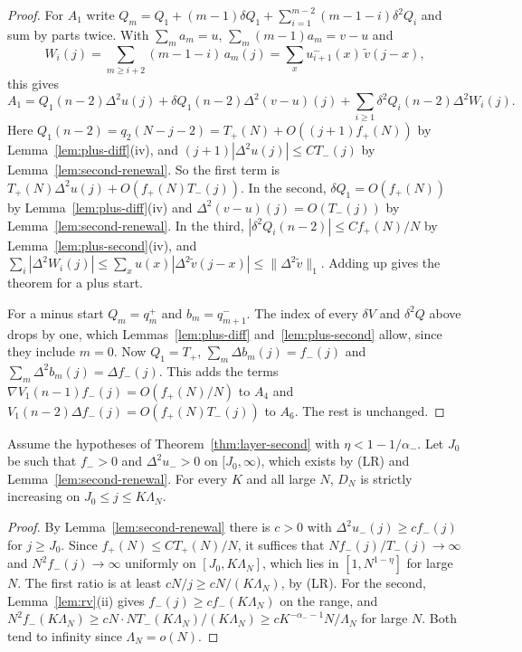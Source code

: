 \begin{proof}
For $A_1$ write
$Q_m=Q_1+(m-1)\delta Q_1+\sum_{i=1}^{m-2}(m-1-i)\delta^2Q_i$ and sum by parts twice. With
$\sum_ma_m=u$, $\sum_m(m-1)a_m=v-u$ and
\[
 W_i(j)=\sum_{m\ge i+2}(m-1-i)\,a_m(j)=\sum_xu^\minus_{i+1}(x)\,\tilde v(j-x),
\]
this gives
\[
 A_1=Q_1(n-2)\Delta^2u(j)+\delta Q_1(n-2)\Delta^2(v-u)(j)+\sum_{i\ge1}\delta^2Q_i(n-2)\Delta^2W_i(j).
\]
Here $Q_1(n-2)=q_2(N-j-2)=T_\plus(N)+O((j+1)f_\plus(N))$ by Lemma~\ref{lem:plus-diff}(iv), and
$(j+1)|\Delta^2u(j)|\le CT_\minus(j)$ by Lemma~\ref{lem:second-renewal}. So the first term is
$T_\plus(N)\Delta^2u(j)+O(f_\plus(N)T_\minus(j))$. In the second, $\delta Q_1=O(f_\plus(N))$ by
Lemma~\ref{lem:plus-diff}(iv) and $\Delta^2(v-u)(j)=O(T_\minus(j))$ by
Lemma~\ref{lem:second-renewal}. In the third, $|\delta^2Q_i(n-2)|\le Cf_\plus(N)/N$ by
Lemma~\ref{lem:plus-second}(iv), and
$\sum_i|\Delta^2W_i(j)|\le\sum_xu(x)|\Delta^2\tilde v(j-x)|\le\|\Delta^2\tilde v\|_1$. Adding up
gives the theorem for a plus start.

For a minus start $Q_m=q^\plus_m$ and $b_m=q^\minus_{m+1}$. The index of every $\delta V$ and
$\delta^2Q$ above drops by one, which Lemmas~\ref{lem:plus-diff} and~\ref{lem:plus-second} allow,
since they include $m=0$. Now $Q_1=T_\plus$, $\sum_m\Delta b_m(j)=f_\minus(j)$ and
$\sum_m\Delta^2b_m(j)=\Delta f_\minus(j)$. This adds the terms $\nabla V_1(n-1)f_\minus(j)=O(f_\plus(N)/N)$
to $A_4$ and $V_1(n-2)\Delta f_\minus(j)=O(f_\plus(N)T_\minus(j))$ to $A_6$. The rest is unchanged.
\end{proof}

\begin{corollary}\label{cor:convex}
Assume the hypotheses of Theorem~\ref{thm:layer-second} with $\eta<1-1/\alpha_\minus$. Let $J_0$
be such that $f_\minus>0$ and $\Delta^2u_\minus>0$ on $[J_0,\infty)$, which exists by (LR) and
Lemma~\ref{lem:second-renewal}. For every $K$ and all large $N$, $D_N$ is strictly increasing on
$J_0\le j\le K\Lambda_N$.
\end{corollary}

\begin{proof}
By Lemma~\ref{lem:second-renewal} there is $c>0$ with $\Delta^2u_\minus(j)\ge cf_\minus(j)$ for
$j\ge J_0$. Since $f_\plus(N)\le CT_\plus(N)/N$, it suffices that $Nf_\minus(j)/T_\minus(j)\to\infty$
and $N^2f_\minus(j)\to\infty$ uniformly on $[J_0,K\Lambda_N]$, which lies in $[1,N^{1-\eta}]$ for
large $N$. The first ratio is at least $cN/j\ge cN/(K\Lambda_N)$, by (LR). For the second,
Lemma~\ref{lem:rv}(ii) gives $f_\minus(j)\ge cf_\minus(K\Lambda_N)$ on the range, and
$N^2f_\minus(K\Lambda_N)\ge cN\cdot NT_\minus(K\Lambda_N)/(K\Lambda_N)\ge cK^{-\alpha_\minus-1}N/\Lambda_N$
for large $N$. Both tend to infinity since $\Lambda_N=o(N)$.
\end{proof}

